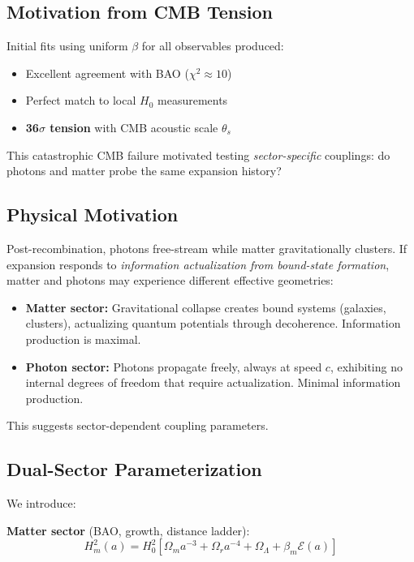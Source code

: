 \documentclass[twocolumn,superscriptaddress,prl,amsmath,amssymb]{revtex4-2}
\begin{document}
\subsection{Motivation from CMB Tension}

Initial fits using uniform $\beta$ for all observables produced:
\begin{itemize}
\item Excellent agreement with BAO ($\chi^2 \approx 10$)
\item Perfect match to local $H_0$ measurements
\item \textbf{36$\sigma$ tension} with CMB acoustic scale $\theta_s$
\end{itemize}

This catastrophic CMB failure motivated testing \textit{sector-specific} couplings: do photons and matter probe the same expansion history?

\subsection{Physical Motivation}

Post-recombination, photons free-stream while matter gravitationally clusters. If expansion responds to \textit{information actualization from bound-state formation}, matter and photons may experience different effective geometries:

\begin{itemize}
\item \textbf{Matter sector:} Gravitational collapse creates bound systems (galaxies, clusters), actualizing quantum potentials through decoherence. Information production is maximal.
\item \textbf{Photon sector:} Photons propagate freely, always at speed $c$, exhibiting no internal degrees of freedom that require actualization. Minimal information production.
\end{itemize}

This suggests sector-dependent coupling parameters.

\subsection{Dual-Sector Parameterization}

We introduce:

\textbf{Matter sector} (BAO, growth, distance ladder):
\begin{equation}
H^2_m(a) = H_0^2[\Omega_m a^{-3} + \Omega_r a^{-4} + \Omega_\Lambda + \beta_m \mathcal{E}(a)]
\end{equation}
\end{document}
